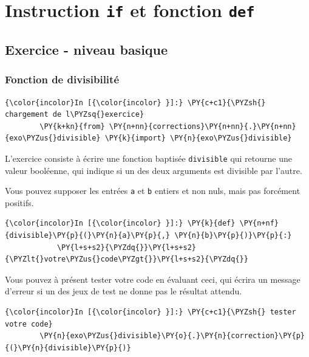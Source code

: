     \hypertarget{instruction-if-et-fonction-def}{%
\section{\texorpdfstring{Instruction \texttt{if} et fonction
\texttt{def}}{Instruction if et fonction def}}\label{instruction-if-et-fonction-def}}

    \hypertarget{exercice---niveau-basique}{%
\subsection{Exercice - niveau basique}\label{exercice---niveau-basique}}

    \hypertarget{fonction-de-divisibilituxe9}{%
\subsubsection{Fonction de
divisibilité}\label{fonction-de-divisibilituxe9}}

    \begin{Verbatim}[commandchars=\\\{\}]
{\color{incolor}In [{\color{incolor} }]:} \PY{c+c1}{\PYZsh{} chargement de l\PYZsq{}exercice}
        \PY{k+kn}{from} \PY{n+nn}{corrections}\PY{n+nn}{.}\PY{n+nn}{exo\PYZus{}divisible} \PY{k}{import} \PY{n}{exo\PYZus{}divisible}
\end{Verbatim}


    L'exercice consiste à écrire une fonction baptisée \texttt{divisible}
qui retourne une valeur booléenne, qui indique si un des deux arguments
est divisible par l'autre.

Vous pouvez supposer les entrées \texttt{a} et \texttt{b} entiers et non
nuls, mais pas forcément positifs.

    \begin{Verbatim}[commandchars=\\\{\}]
{\color{incolor}In [{\color{incolor} }]:} \PY{k}{def} \PY{n+nf}{divisible}\PY{p}{(}\PY{n}{a}\PY{p}{,} \PY{n}{b}\PY{p}{)}\PY{p}{:}
            \PY{l+s+s2}{\PYZdq{}}\PY{l+s+s2}{\PYZlt{}votre\PYZus{}code\PYZgt{}}\PY{l+s+s2}{\PYZdq{}}
\end{Verbatim}


    Vous pouvez à présent tester votre code en évaluant ceci, qui écrira un
message d'erreur si un des jeux de test ne donne pas le résultat
attendu.

    \begin{Verbatim}[commandchars=\\\{\}]
{\color{incolor}In [{\color{incolor} }]:} \PY{c+c1}{\PYZsh{} tester votre code}
        \PY{n}{exo\PYZus{}divisible}\PY{o}{.}\PY{n}{correction}\PY{p}{(}\PY{n}{divisible}\PY{p}{)}
\end{Verbatim}



